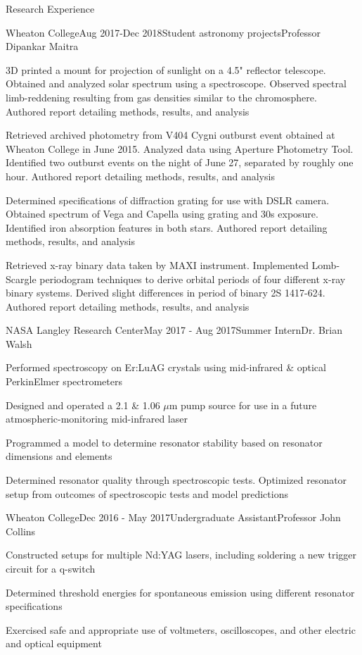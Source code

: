 \documentclass{resume} %
\begin{document}
\begin{rSection}{Research Experience}
\begin{rSubsection}{Wheaton College}{Aug 2017-Dec 2018}{Student astronomy projects}{Professor Dipankar Maitra}
\item 3D printed a mount for projection of sunlight on a 4.5" reflector telescope. Obtained and analyzed solar spectrum using a spectroscope. Observed spectral limb-reddening resulting from gas densities similar to the chromosphere. Authored report detailing methods, results, and analysis
\item Retrieved archived photometry from V404 Cygni outburst event obtained at Wheaton College in June 2015. Analyzed data using Aperture Photometry Tool. Identified two outburst events on the night of June 27, separated by roughly one hour. Authored report detailing methods, results, and analysis
\item Determined specifications of diffraction grating for use with DSLR camera. Obtained spectrum of Vega and Capella using grating and 30s exposure. Identified iron absorption features in both stars. Authored report detailing methods, results, and analysis
\item Retrieved x-ray binary data taken by MAXI instrument. Implemented Lomb-Scargle periodogram techniques to derive orbital periods of four different x-ray binary systems. Derived slight differences in period of binary 2S 1417-624. Authored report detailing methods, results, and analysis
\end{rSubsection}

\begin{rSubsection}{NASA Langley Research Center}{May 2017 - Aug 2017}{Summer Intern}{Dr. Brian Walsh}
\item Performed spectroscopy on Er:LuAG crystals using mid-infrared \& optical PerkinElmer spectrometers
\item Designed and operated a 2.1 \& 1.06 $\mu$m pump source for use in a future atmospheric-monitoring mid-infrared laser
\item Programmed a model to determine resonator stability based on resonator dimensions and elements
\item Determined resonator quality through spectroscopic tests. Optimized resonator setup from outcomes of spectroscopic tests and model predictions
\end{rSubsection}

\begin{rSubsection}{Wheaton College}{Dec 2016 - May 2017}{Undergraduate Assistant}{Professor John Collins}
\item Constructed setups for multiple Nd:YAG lasers, including soldering a new trigger circuit for a q-switch
\item Determined threshold energies for spontaneous emission using different resonator specifications
\item Exercised safe and appropriate use of voltmeters, oscilloscopes, and other electric and optical equipment
\end{rSubsection}

\end{rSection}
\end{document}
